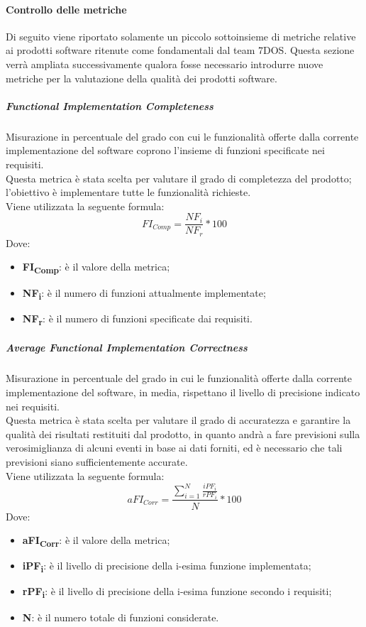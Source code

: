 \paragraph{Controllo delle metriche} \Spazio
Di seguito viene riportato solamente un piccolo sottoinsieme di metriche relative ai prodotti software ritenute come fondamentali dal team 7DOS.
Questa sezione verrà ampliata successivamente qualora fosse necessario introdurre nuove metriche per la valutazione della qualità dei prodotti software.

\subparagraph{Functional Implementation Completeness}\Spazio
Misurazione in percentuale del grado con cui le funzionalità offerte dalla corrente implementazione del software coprono l'insieme di funzioni specificate nei requisiti.\\
Questa metrica è stata scelta per valutare il grado di completezza del prodotto; l'obiettivo è implementare tutte le funzionalità richieste.\\
Viene utilizzata la seguente formula:
$$FI_{Comp}=\frac{NF_i}{NF_r}*100$$
Dove:
\begin{itemize}
	\item{\textbf{FI\textsubscript{Comp}}: è il valore della metrica;}
	\item{\textbf{NF\textsubscript{i}}: è il numero di funzioni attualmente implementate;}
	\item{\textbf{NF\textsubscript{r}}: è il numero di funzioni specificate dai requisiti.}
\end{itemize}
\subparagraph{Average Functional Implementation Correctness}\Spazio
Misurazione in percentuale del grado in cui le funzionalità offerte dalla corrente implementazione del software, in media, rispettano il livello di precisione indicato nei requisiti.\\
Questa metrica è stata scelta per valutare il grado di accuratezza e garantire la qualità dei risultati restituiti dal prodotto, in quanto andrà a fare previsioni sulla verosimiglianza di alcuni eventi in base ai dati forniti, ed è necessario che tali previsioni siano sufficientemente accurate.\\
Viene utilizzata la seguente formula:
$$aFI_{Corr}=\frac{\sum\limits_{i=1}^N\frac{iPF_i}{rPF_i}}{N}*100$$
Dove:
\begin{itemize}
	\item{\textbf{aFI\textsubscript{Corr}}: è il valore della metrica;}
	\item{\textbf{iPF\textsubscript{i}}: è il livello di precisione della i-esima funzione implementata;}
	\item{\textbf{rPF\textsubscript{i}}: è il livello di precisione della i-esima funzione secondo i requisiti;}
	\item{\textbf{N}: è il numero totale di funzioni considerate.}
\end{itemize}
